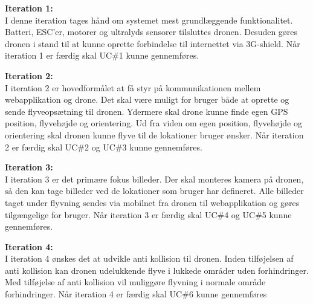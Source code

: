 \textbf{Iteration 1:} \\
I denne iteration tages hånd om systemet mest grundlæggende funktionalitet. Batteri, ESC'er, motorer og ultralyds sensorer tilsluttes dronen. Desuden gøres dronen i stand til at kunne oprette forbindelse til internettet via 3G-shield. Når iteration 1 er færdig skal UC\#1 kunne gennemføres.  

\textbf{Iteration 2:} \\
I iteration 2 er hovedformålet at få styr på kommunikationen mellem webapplikation og drone. Det skal være muligt for bruger både at oprette og sende flyveopsætning til dronen. 
Ydermere skal drone kunne finde egen GPS position, flyvehøjde og orientering. Ud fra viden om egen position, flyvehøjde og orientering skal dronen kunne flyve til de lokationer bruger ønsker. Når iteration 2 er færdig skal UC\#2 og UC\#3 kunne gennemføres.  

\textbf{Iteration 3:}  \\
I iteration 3 er det primære fokus billeder. Der skal monteres kamera på dronen, så den kan tage billeder ved de lokationer som bruger har defineret. Alle billeder taget under flyvning sendes via mobilnet fra dronen til webapplikation og gøres tilgængelige for bruger. Når iteration 3 er færdig skal UC\#4 og UC\#5 kunne gennemføres.

\textbf{Iteration 4:} \\
I iteration 4 ønskes det at udvikle anti kollision til dronen. 
Inden tilføjelsen af anti kollision kan dronen udelukkende flyve i lukkede områder uden forhindringer. Med tilføjelse af anti kollision vil muliggøre flyvning i normale område forhindringer. Når iteration 4 er færdig skal UC\#6 kunne gennemføres  